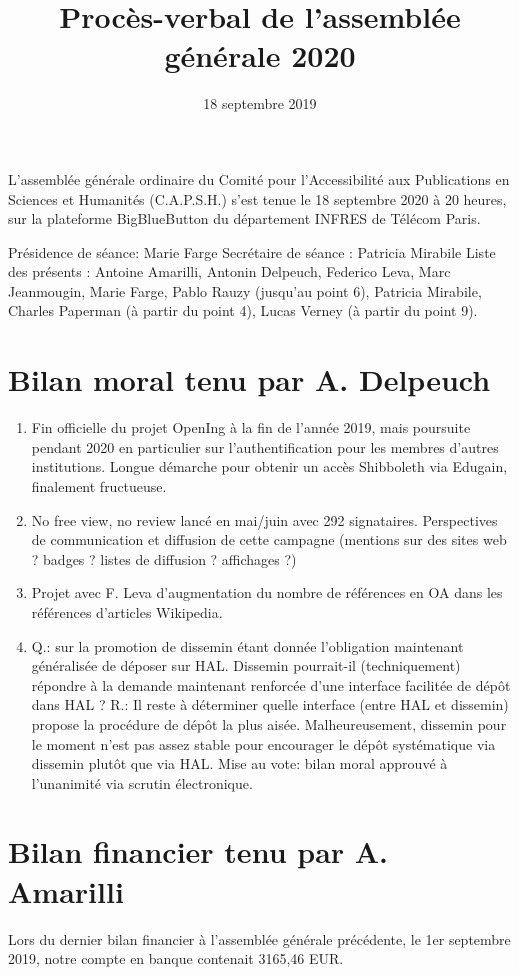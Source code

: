\documentclass[a4paper]{article}
\title{Procès-verbal de l'assemblée générale 2020}
\date{18 septembre 2019}
\begin{document}
\maketitle

L'assemblée générale ordinaire du Comité pour l'Accessibilité aux Publications en Sciences et Humanités (C.A.P.S.H.) s'est tenue le 18 septembre 2020 à 20 heures, sur la plateforme BigBlueButton du département INFRES de Télécom Paris. 

Présidence de séance: Marie Farge
Secrétaire de séance : Patricia Mirabile
Liste des présents : Antoine Amarilli, Antonin Delpeuch, Federico Leva, Marc Jeanmougin, Marie Farge, Pablo Rauzy (jusqu'au point 6), Patricia Mirabile, Charles Paperman (à partir du point 4), Lucas Verney (à partir du point 9).
    
\section{Bilan moral tenu par A. Delpeuch}

\begin{enumerate}
\item Fin officielle du projet OpenIng à la fin de l'année 2019, mais poursuite pendant 2020 en particulier sur l'authentification pour les membres d'autres institutions. Longue démarche pour obtenir un accès Shibboleth via Edugain, finalement fructueuse. 
\item No free view, no review lancé en mai/juin avec 292 signataires. Perspectives de communication et diffusion de cette campagne (mentions sur des sites web ? badges ? listes de diffusion ? affichages ?)
\item Projet avec F. Leva d'augmentation du nombre de références en OA dans les références d'articles Wikipedia. 
\item Q.: sur la promotion de dissemin étant donnée l'obligation maintenant généralisée de déposer sur HAL. Dissemin pourrait-il (techniquement) répondre à la demande maintenant renforcée d'une interface facilitée de dépôt dans HAL ? R.: Il reste à déterminer quelle interface (entre HAL et dissemin) propose la procédure de dépôt la plus aisée. Malheureusement, dissemin pour le moment n'est pas assez stable pour encourager le dépôt systématique via dissemin plutôt que via HAL. 
  Mise au vote: bilan moral approuvé à l'unanimité via scrutin électronique.
\end{enumerate}

\section{Bilan financier tenu par A. Amarilli}
Lors du dernier bilan financier à l'assemblée générale précédente, le 1er septembre 2019, notre compte en banque contenait 3165,46 EUR.
\end{document}
